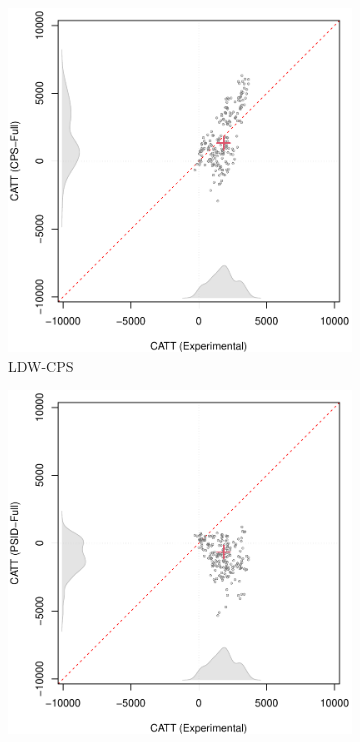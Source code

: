 \documentclass[letterpaper,12pt,leqno]{article}
\begin{document}
\begin{figure}[!ht]
    \caption{Placebo Tests using LDW Data: Experimental vs. Nonexperimental}\label{fig:no74}
    \vspace{-1em}
    \begin{minipage}[c]{1\textwidth}
        \centering
        \begin{subfigure}{0.4\linewidth}
            \includegraphics[width=\linewidth]{catt_no74_cps.pdf}
            \caption{LDW-CPS}
        \end{subfigure}
        \begin{subfigure}{0.4\linewidth}
            \includegraphics[width=\linewidth]{catt_no74_PSID.pdf}

\end{subfigure}
\end{minipage}
\end{figure}
\end{document}

